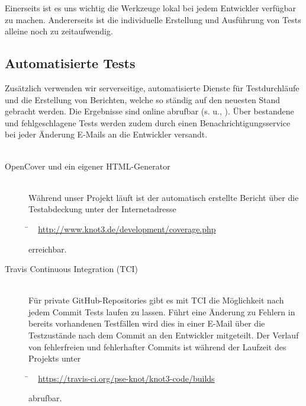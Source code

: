 Einerseits ist es uns wichtig die Werkzeuge lokal bei jedem Entwickler verfügbar zu machen. Andererseits ist die individuelle Erstellung und Ausführung von Tests alleine noch zu zeitaufwendig. 



\subsection{Automatisierte Tests}
\label{Abschnitt:Tests:Werkzeuge:Automatisiert}

Zusätzlich verwenden wir serverseitige, automatisierte Dienste für Testdurchläufe und die Erstellung von Berichten, welche so ständig auf den neuesten Stand gebracht werden. Die Ergebnisse sind online abrufbar (s. u., ). Über bestandene und fehlgeschlagene Tests werden zudem durch einen Benachrichtigungsservice bei jeder Änderung E-Mails an die Entwickler versandt.
\\
\\


\begin{description}

	\item[OpenCover und ein eigener HTML-Generator] \hfill
	\\
	
	Während unser Projekt läuft ist der automatisch erstellte Bericht über die Testabdeckung unter der Internetadresse
	
	\begin{tabbing}
			\= ~ \href {http://www.knot3.de/development/coverage.php}
					   {http://www.knot3.de/development/coverage.php}
					   
	\end{tabbing} erreichbar.
	\\
	
	\item[Travis Continuous Integration (TCI)] \hfill
	\\
	
	Für private GitHub-Repositories gibt es mit TCI die Möglichkeit nach jedem Commit Tests laufen zu lassen.
	Führt eine Änderung zu Fehlern in bereits vorhandenen Testfällen wird dies in einer E-Mail über die Testzustände nach dem Commit an den Entwickler mitgeteilt. Der Verlauf von fehlerfreien und fehlerhafter Commits ist während der Laufzeit des Projekts unter
	
	\begin{tabbing}
			\= ~ \href {https://travis-ci.org/pse-knot/knot3-code/builds}
		    {https://travis-ci.org/pse-knot/knot3-code/builds}
		   
	\end{tabbing} abrufbar.
	\\
	

\end{description}


